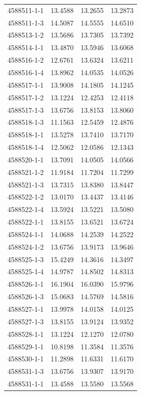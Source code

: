 \begin{longtable}{lrrr}
4588511-1-1 & 13.4588 & 13.2655 & 13.2873 \\
4588511-1-3 & 14.5087 & 14.5555 & 14.6510 \\
4588513-1-2 & 13.5686 & 13.7305 & 13.7392 \\
4588514-1-1 & 13.4870 & 13.5946 & 13.6068 \\
4588516-1-2 & 12.6761 & 13.6324 & 13.6211 \\
4588516-1-4 & 13.8962 & 14.0535 & 14.0526 \\
4588517-1-1 & 13.9008 & 14.1805 & 14.1245 \\
4588517-1-2 & 13.1224 & 12.4253 & 12.4118 \\
4588517-1-3 & 13.6756 & 13.8153 & 13.8060 \\
4588518-1-3 & 11.1563 & 12.5459 & 12.4876 \\
4588518-1-1 & 13.5278 & 13.7410 & 13.7170 \\
4588518-1-4 & 12.5062 & 12.0586 & 12.1343 \\
4588520-1-1 & 13.7091 & 14.0505 & 14.0566 \\
4588521-1-2 & 11.9184 & 11.7204 & 11.7299 \\
4588521-1-3 & 13.7315 & 13.8380 & 13.8447 \\
4588522-1-2 & 13.0170 & 13.4437 & 13.4146 \\
4588522-1-4 & 13.5924 & 13.5221 & 13.5080 \\
4588522-1-1 & 13.8155 & 13.6521 & 13.6724 \\
4588524-1-1 & 14.0688 & 14.2539 & 14.2522 \\
4588524-1-2 & 13.6756 & 13.9173 & 13.9646 \\
4588525-1-3 & 15.4249 & 14.3616 & 14.3497 \\
4588525-1-4 & 14.9787 & 14.8502 & 14.8313 \\
4588526-1-1 & 16.1904 & 16.0390 & 15.9796 \\
4588526-1-3 & 15.0683 & 14.5769 & 14.5816 \\
4588527-1-1 & 13.9978 & 14.0158 & 14.0125 \\
4588527-1-3 & 13.8155 & 13.9124 & 13.9352 \\
4588528-1-1 & 13.1224 & 12.1270 & 12.0780 \\
4588529-1-1 & 10.8198 & 11.3584 & 11.3576 \\
4588530-1-1 & 11.2898 & 11.6331 & 11.6170 \\
4588531-1-3 & 13.6756 & 13.9307 & 13.9170 \\
4588531-1-1 & 13.4588 & 13.5580 & 13.5568 \\

\end{longtable}

